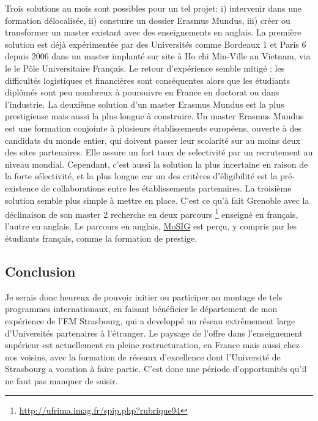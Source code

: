 \documentclass[11pt]{article}
\begin{document}
Trois solutions au mois sont possibles pour un tel projet: i) intervenir 
dans une formation délocalisée, ii) constuire un dossier Erasmus Mundus, 
iii) créer ou transformer un master existant avec des enseignements en 
anglais. La première solution est déjà expérimentée par des Universités 
comme Bordeaux 1 et Paris 6 depuis 2006 dans un master implanté sur site 
à Ho chi Min-Ville au Vietnam, via le le Pôle Universitaire Français.
Le retour d'expérience semble mitigé : les difficultés logistiques et
financières sont conséquentes alors que les étudiants diplômés sont peu
nombreux à poursuivre en France en doctorat ou dans l'industrie.
La deuxième solution d'un master Erasmus Mundus est la plus prestigieuse 
mais aussi la plus longue à construire. Un master Erasmus Mundus est une
formation conjointe à plusieurs établissements européens, ouverte à des 
candidats du monde entier, qui doivent passer leur scolarité sur au moins
deux des sites partenaires. Elle assure un fort taux de selectivité par
un recrutement au niveau mondial. Cependant, c'est aussi la solution la
plus incertaine en raison de la forte sélectivité, et la plus longue car 
un des critères d'éligibilité est la pré-existence de collaborations
entre les établissements partenaires. La troisième solution semble plus 
simple à mettre en place. C'est ce qu'à fait Grenoble avec la déclinaison 
de son master 2 recherche en deux parcours%
\footnote{\url{http://ufrima.imag.fr/spip.php?rubrique94}} enseigné en 
français, l'autre en anglais. Le parcours en anglais, 
\href{http://mosig.imag.fr/}{MoSIG} est perçu, y compris par les 
étudiants français, comme la formation de prestige. 



\subsection*{Conclusion}

Je serais donc heureux de pouvoir initier ou participer au montage de tels
programmes internationaux, en faisant bénéficier le département de mon 
expérience de l'EM Strasbourg, qui a developpé un réseau extrêmement large
d'Universités partenaires à l'étranger. Le paysage de l'offre dans 
l'enseignement supérieur est actuellement en pleine restructuration, en 
France mais aussi chez nos voisins, avec la formation de réseaux d'excellence 
dont l'Université de Strasbourg a vocation à faire partie. C'est donc une 
période d'opportunités qu'il ne faut pas manquer de saisir.
\end{document}
